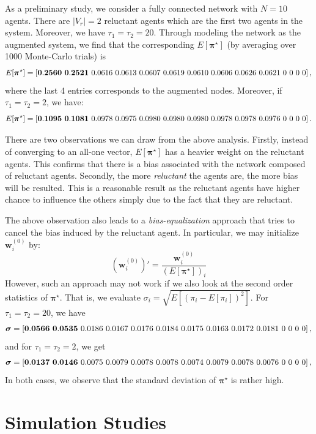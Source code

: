 \documentclass[letter]{article}
\theoremstyle{remark}
\begin{document}
As a preliminary study, we consider a fully connected network with $N=10$ agents. There are $|V_r| = 2$ reluctant agents which are the first two agents in the system. Moreover, we have $\tau_1 = \tau_2 = 20$. Through modeling the network as the augmented system, we find that the corresponding $E[\bm{\pi}^\star]$ (by averaging over 1000 Monte-Carlo trials) is 
\[
E[\bm{\pi}^\star] = \left[  {\bf 0.2560~0.2521}~0.0616~ 0.0613~0.0607~0.0619~0.0610~ 0.0606~0.0626~0.0621~0~0~0~0 \right],
\]
where the last 4 entries corresponds to the augmented nodes. Moreover, if $\tau_1 = \tau_2 = 2$, we have:
\[
E[\bm{\pi}^\star] = \left[  {\bf 0.1095~0.1081}~0.0978~0.0975~0.0980~0.0980~0.0980~0.0978~0.0978~0.0976~0~0~0~0 \right].
\]

There are two observations we can draw from the above analysis. Firstly, instead of converging to an all-one vector, $E[\bm{\pi}^\star]$ has  a heavier weight on the reluctant agents. This confirms that there is a bias associated with the network composed of reluctant agents. Secondly, the more \emph{reluctant} the agents are, the more bias will be resulted. This is a reasonable result as the reluctant agents have higher chance to influence the others simply due to the fact that they are reluctant. 

The above observation also leads to a \emph{bias-equalization} approach that tries to cancel the bias induced by the reluctant agent. In particular, we may initialize ${\bm w}_i^{(0)}$ by:
\[
({\bm w}_i^{(0)})' = \frac{{\bm w}_i^{(0)}}{ (E[\bm{\pi}^\star])_i }
\]
However, such an approach may not work if we also look at the second order statistics of $\bm{\pi}^\star$. That is, we evaluate $\sigma_i = \sqrt{E[ (\pi_i - E[\pi_i])^2 ]}$. For $\tau_1 = \tau_2 = 20$, we have
\[
\bm{\sigma} = \left[  {\bf 0.0566~0.0535} ~0.0186~0.0167~0.0176~0.0184~0.0175~0.0163~0.0172~0.0181~0~0~0~0 \right],
\]
and for $\tau_1 = \tau_2 = 2$, we get
\[
\bm{\sigma} = \left[  {\bf 0.0137~0.0146} ~0.0075~0.0079~0.0078~0.0078~0.0074~0.0079~0.0078~0.0076~0~0~0~0 \right],
\]
In both cases, we observe that the standard deviation of $\bm{\pi}^\star$ is rather high. 


\section{Simulation Studies}
\end{document}

